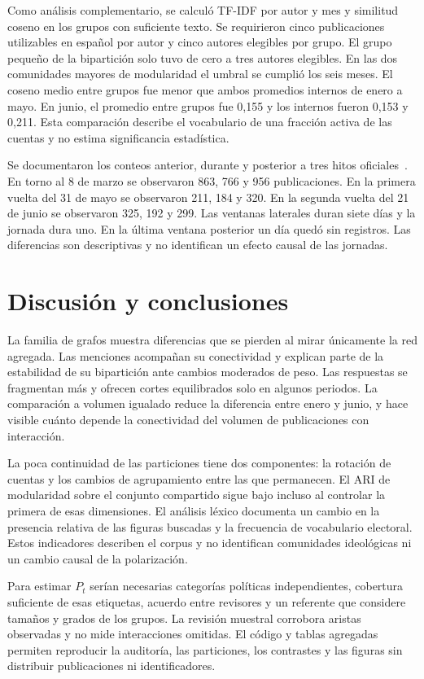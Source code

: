 \documentclass[journal]{IEEEtran}
\begin{document}
Como análisis complementario, se calculó TF-IDF por autor y mes y similitud coseno en los grupos con suficiente texto. Se requirieron cinco publicaciones utilizables en español por autor y cinco autores elegibles por grupo. El grupo pequeño de la bipartición solo tuvo de cero a tres autores elegibles. En las dos comunidades mayores de modularidad el umbral se cumplió los seis meses. El coseno medio entre grupos fue menor que ambos promedios internos de enero a mayo. En junio, el promedio entre grupos fue 0,155 y los internos fueron 0,153 y 0,211. Esta comparación describe el vocabulario de una fracción activa de las cuentas y no estima significancia estadística.

Se documentaron los conteos anterior, durante y posterior a tres hitos oficiales~\cite{registraduria}. En torno al 8 de marzo se observaron 863, 766 y 956 publicaciones. En la primera vuelta del 31 de mayo se observaron 211, 184 y 320. En la segunda vuelta del 21 de junio se observaron 325, 192 y 299. Las ventanas laterales duran siete días y la jornada dura uno. En la última ventana posterior un día quedó sin registros. Las diferencias son descriptivas y no identifican un efecto causal de las jornadas.

\section{Discusión y conclusiones}
La familia de grafos muestra diferencias que se pierden al mirar únicamente la red agregada. Las menciones acompañan su conectividad y explican parte de la estabilidad de su bipartición ante cambios moderados de peso. Las respuestas se fragmentan más y ofrecen cortes equilibrados solo en algunos periodos. La comparación a volumen igualado reduce la diferencia entre enero y junio, y hace visible cuánto depende la conectividad del volumen de publicaciones con interacción.

La poca continuidad de las particiones tiene dos componentes: la rotación de cuentas y los cambios de agrupamiento entre las que permanecen. El ARI de modularidad sobre el conjunto compartido sigue bajo incluso al controlar la primera de esas dimensiones. El análisis léxico documenta un cambio en la presencia relativa de las figuras buscadas y la frecuencia de vocabulario electoral. Estos indicadores describen el corpus y no identifican comunidades ideológicas ni un cambio causal de la polarización.

Para estimar $P_t$ serían necesarias categorías políticas independientes, cobertura suficiente de esas etiquetas, acuerdo entre revisores y un referente que considere tamaños y grados de los grupos. La revisión muestral corrobora aristas observadas y no mide interacciones omitidas. El código y tablas agregadas permiten reproducir la auditoría, las particiones, los contrastes y las figuras sin distribuir publicaciones ni identificadores.
\end{document}
